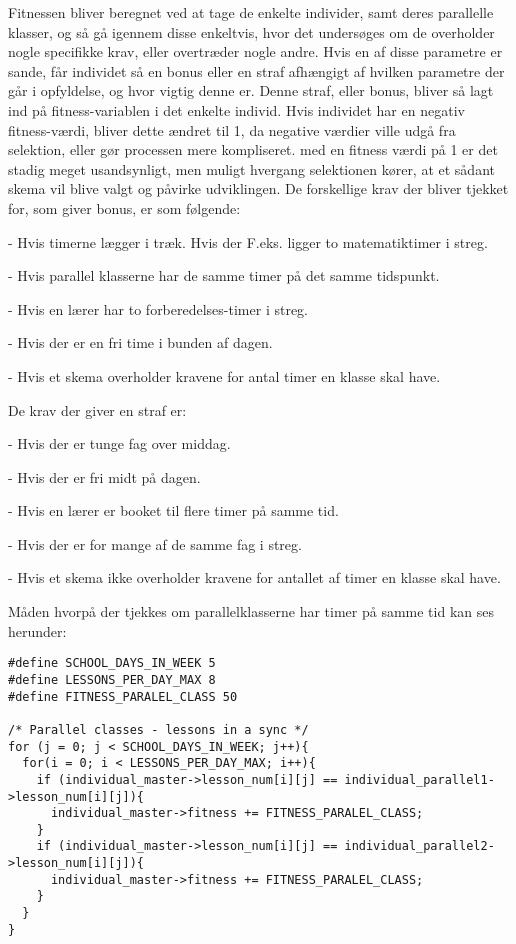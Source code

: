 Fitnessen bliver beregnet ved at tage de enkelte individer, samt deres parallelle klasser, og så gå igennem disse enkeltvis, hvor det undersøges om de overholder nogle specifikke krav, eller overtræder nogle andre. Hvis en af disse parametre er sande, får individet så en bonus eller en straf afhængigt af hvilken parametre der går i opfyldelse, og hvor vigtig denne er. Denne straf, eller bonus, bliver så lagt ind på fitness-variablen i det enkelte individ. Hvis individet har en negativ fitness-værdi, bliver dette ændret til 1, da negative værdier ville udgå fra selektion, eller gør processen mere kompliseret. med en fitness værdi på 1 er det stadig meget usandsynligt, men muligt hvergang selektionen kører, at et sådant skema vil blive valgt og påvirke udviklingen.
De forskellige krav der bliver tjekket for, som giver bonus, er som følgende:

   -	Hvis timerne lægger i træk. Hvis der F.eks. ligger to matematiktimer i streg.
   
   -	Hvis parallel klasserne har de samme timer på det samme tidspunkt. 
   
   -	Hvis en lærer har to forberedelses-timer i streg.
   
   -	Hvis der er en fri time i bunden af dagen.
   
   -	Hvis et skema overholder kravene for antal timer en klasse skal have.
   
   
De krav der giver en straf er:

   -	Hvis der er tunge fag over middag.
   
   -	Hvis der er fri midt på dagen.
   
   -	Hvis en lærer er booket til flere timer på samme tid.
   
   -	Hvis der er for mange af de samme fag i streg.
   
   -	Hvis et skema ikke overholder kravene for antallet af timer en klasse skal have.

Måden hvorpå der tjekkes om parallelklasserne har timer på samme tid kan ses herunder:

\begin{lstlisting}
#define SCHOOL_DAYS_IN_WEEK 5
#define LESSONS_PER_DAY_MAX 8
#define FITNESS_PARALEL_CLASS 50

/* Parallel classes - lessons in a sync */
for (j = 0; j < SCHOOL_DAYS_IN_WEEK; j++){
  for(i = 0; i < LESSONS_PER_DAY_MAX; i++){
    if (individual_master->lesson_num[i][j] == individual_parallel1->lesson_num[i][j]){
      individual_master->fitness += FITNESS_PARALEL_CLASS;
    }
    if (individual_master->lesson_num[i][j] == individual_parallel2->lesson_num[i][j]){
      individual_master->fitness += FITNESS_PARALEL_CLASS;
    }
  }
}
\end{lstlisting}

